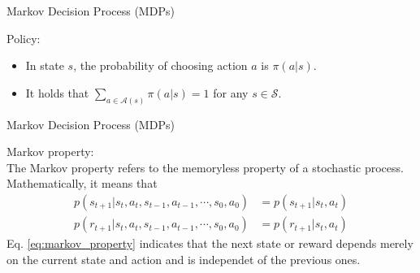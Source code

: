 \documentclass[aspectratio=169,xcolor=dvipsnames]{beamer}
\begin{document}

\begin{frame}{Markov Decision Process (MDPs)}

Policy:
\begin{itemize}
	\item In state $s$, the probability of choosing action $a$ is $\pi(a|s)$.
	\item It holds that $\sum_{a \in \mathcal{A}(s)} \pi(a|s) = 1$ for any $s \in \mathcal{S}$.
\end{itemize}

\end{frame}

\begin{frame}{Markov Decision Process (MDPs)}

Markov property: \\
The Markov property refers to the memoryless property of a stochastic process.
Mathematically, it means that
\begin{equation} \label{eq:markov_property}
	\begin{aligned}
		p(s_{t + 1} | s_t, a_t, s_{t - 1}, a_{t - 1}, \cdots, s_0, a_0) &= p(s_{t + 1} | s_t, a_t) \\
		p(r_{t + 1} | s_t, a_t, s_{t - 1}, a_{t - 1}, \cdots, s_0, a_0) &= p(r_{t + 1} | s_t, a_t)
	\end{aligned}
\end{equation}
Eq. \eqref{eq:markov_property} indicates that the next state or reward depends merely on the current state and action and is independet of the previous ones.

\end{frame}
\end{document}

